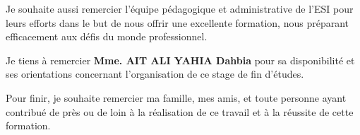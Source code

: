 \medskip

Je souhaite aussi remercier l'équipe pédagogique et administrative de l'ESI pour leurs efforts dans le but de nous offrir une excellente formation, nous préparant efficacement aux défis du monde professionnel.

\medskip

Je tiens à remercier \textbf{Mme. AIT ALI YAHIA Dahbia} pour sa disponibilité et ses orientations concernant l'organisation de ce stage de fin d'études.

\medskip

Pour finir, je souhaite remercier ma famille, mes amis, et toute personne ayant contribué de près ou de loin à la réalisation de ce travail et à la réussite de cette formation.

\clearpage